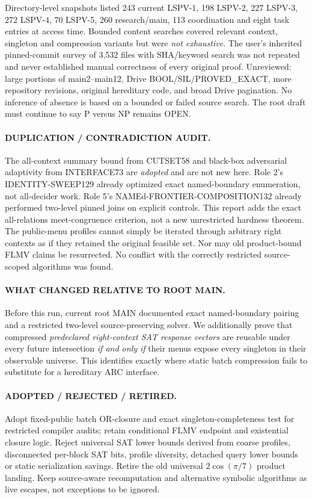 \documentclass[11pt]{article}
\begin{document}
Directory-level snapshots listed 243 current LSPV-1,
198 LSPV-2, 227 LSPV-3, 272 LSPV-4,
70 LSPV-5, 260 research/main, 113 coordination
and eight task entries at access time. Bounded content
searches covered relevant context, singleton and
compression variants but were \emph{not exhaustive}.
The user's inherited pinned-commit survey of 3,532
files with SHA/keyword search was not repeated and never
established manual correctness of every original proof.
Unreviewed: large portions of main2--main12,
Drive BOOL/SIL/PROVED\_EXACT, more repository revisions,
original hereditary code, and broad Drive pagination.
No inference of absence is based on a bounded or
failed source search. The root draft must continue
to say P versus NP remains OPEN.

\paragraph{DUPLICATION / CONTRADICTION AUDIT.}
The all-context summary bound from CUTSET58 and black-box
adversarial adaptivity from INTERFACE73 are \emph{adopted}
and are not new here. Role 2's IDENTITY-SWEEP129 already
optimized exact named-boundary enumeration, not all-decider
work. Role 5's NAMEd-FRONTIER-COMPOSITION132 already
performed two-level pinned joins on explicit controls.
This report adds the exact all-relations meet-congruence
criterion, not a new unrestricted hardness theorem.
The public-menu profiles cannot simply be iterated through
arbitrary right contexts as if they retained the original
feasible set. Nor may old product-bound FLMV claims be
resurrected. No conflict with the correctly restricted
source-scoped algorithms was found.

\paragraph{WHAT CHANGED RELATIVE TO ROOT MAIN.}
Before this run, current root MAIN documented exact
named-boundary pairing and a restricted two-level
source-preserving solver. We additionally prove
that compressed \emph{predeclared right-context SAT
response vectors} are reusable under every future
intersection \emph{if and only if} their menus expose
every singleton in their observable universe.
This identifies exactly where static batch compression
fails to substitute for a hereditary ARC interface.

\paragraph{ADOPTED / REJECTED / RETIRED.}
Adopt fixed-public batch OR-closure and exact
singleton-completeness test for restricted compiler
audits; retain conditional FLMV endpoint and
existential closure logic.
Reject universal SAT lower bounds derived from coarse
profiles, disconnected per-block SAT bits, profile
diversity, detached query lower bounds or static
serialization savings. Retire the old universal
\(2\cos(\pi/7)\) product landing.
Keep source-aware recomputation and alternative symbolic
algorithms as live escapes, not exceptions to be
ignored.
\end{document}
